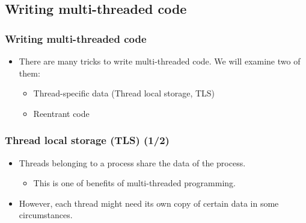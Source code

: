 \documentclass[CJKutf8,xcolor=pdftex,dvipsnames,table]{beamer}
\begin{document}
\begin{CJK*}{UTF8}{song}
\iffalse

  \subsection{Writing multi-threaded code}

  \begin{frame}
  \frametitle{Writing multi-threaded code} \pause
  \begin{itemize}
  \item{There are many tricks to write multi-threaded code. We will examine two of them:} \pause
    \begin{itemize}
    \item{Thread-specific data (Thread local storage, TLS)} \pause
    \item{Reentrant code}
    \end{itemize}
  \end{itemize}
  \end{frame}

  \begin{frame}
  \frametitle{Thread local storage (TLS) (1/2)} \pause
  \begin{itemize}
  \item{Threads belonging to a process share the data of the process.} \pause
    \begin{itemize}
    \item{This is one of benefits of multi-threaded programming.} \pause
    \end{itemize}
  \item{However, each thread might need its own copy of certain data in some circumstances.} \pause
  \end{itemize}
  \end{frame}


\end{CJK*}
\end{document}

